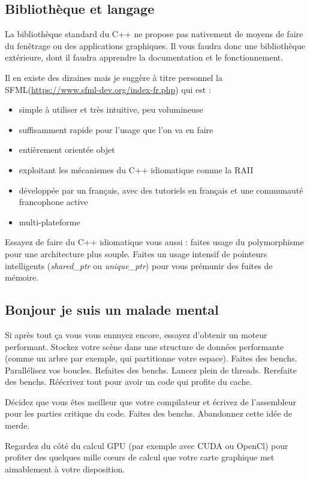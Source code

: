 \documentclass[a4paper, 11pt]{article}
\begin{document}
\subsection{Bibliothèque et langage}  
  
La bibliothèque standard du C++ ne propose pas nativement de moyens de faire du fenêtrage ou des applications graphiques. Il vous faudra donc une bibliothèque extérieure, dont il faudra apprendre la documentation et le fonctionnement.

Il en existe des dizaines mais je suggère à titre personnel la SFML(\url{https://www.sfml-dev.org/index-fr.php}) qui est :  
  
\begin{itemize}
\item simple à utiliser et très intuitive, peu volumineuse
\item suffisamment rapide pour l'usage que l'on va en faire
\item entièrement orientée objet
\item exploitant les mécanismes du C++ idiomatique comme la RAII
\item développée par un français, avec des tutoriels en français et une communauté francophone active
\item multi-plateforme
\end{itemize}

Essayez de faire du C++ idiomatique vous aussi : faites usage du polymorphisme pour une architecture plus souple. Faites un usage intensif de pointeurs intelligents (\textit{shared\_ptr} ou \textit{unique\_ptr}) pour vous prémunir des fuites de mémoire. 

\subsection{Bonjour je suis un malade mental}

Si après tout ça vous vous ennuyez encore, essayez d'obtenir un moteur performant.  
  Stockez votre scène dans une structure de données performante (comme un arbre par exemple, qui partitionne votre espace).
Faites des benchs. Parallélisez vos boucles. Refaites des benchs. Lancez plein de threads. Rerefaite des benchs. Réécrivez tout pour avoir un code qui profite du cache.  
  
Décidez que vous êtes meilleur que votre compilateur et écrivez de l'assembleur pour les parties critique du code. Faites des benchs. Abandonnez cette idée de merde.  
  
Regardez du côté du calcul GPU (par exemple avec CUDA ou OpenCl) pour profiter des quelques mille cœurs de calcul que votre carte graphique met aimablement à votre disposition.     
\end{document}
